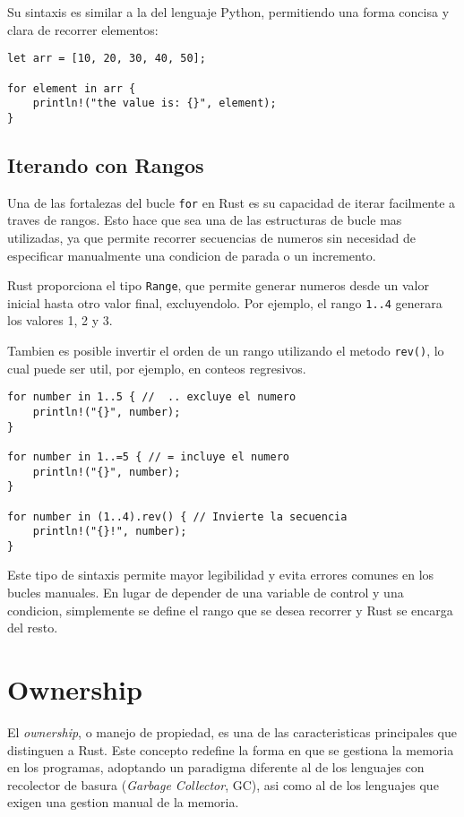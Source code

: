 \documentclass[12pt]{article}
\begin{document}
Su sintaxis es similar a la del lenguaje Python, permitiendo una forma concisa y clara de recorrer elementos:

\begin{lstlisting}[style=ruststyle]
let arr = [10, 20, 30, 40, 50];

for element in arr {
	println!("the value is: {}", element);
}
\end{lstlisting}

\subsection{Iterando con Rangos}

Una de las fortalezas del bucle \texttt{for} en Rust es su capacidad de iterar facilmente a traves de rangos. Esto hace que sea una de las estructuras de bucle mas utilizadas, ya que permite recorrer secuencias de numeros sin necesidad de especificar manualmente una condicion de parada o un incremento.

Rust proporciona el tipo \texttt{Range}, que permite generar numeros desde un valor inicial hasta otro valor final, excluyendolo. Por ejemplo, el rango \texttt{1..4} generara los valores 1, 2 y 3.

Tambien es posible invertir el orden de un rango utilizando el metodo \texttt{rev()}, lo cual puede ser util, por ejemplo, en conteos regresivos.

\begin{lstlisting}[style=ruststyle]
for number in 1..5 { //  .. excluye el numero
	println!("{}", number);
}

for number in 1..=5 { // = incluye el numero
	println!("{}", number);
}

for number in (1..4).rev() { // Invierte la secuencia
	println!("{}!", number);
}
\end{lstlisting}

Este tipo de sintaxis permite mayor legibilidad y evita errores comunes en los bucles manuales. En lugar de depender de una variable de control y una condicion, simplemente se define el rango que se desea recorrer y Rust se encarga del resto.

\section{Ownership}

El \textit{ownership}, o manejo de propiedad, es una de las caracteristicas principales que distinguen a Rust. Este concepto redefine la forma en que se gestiona la memoria en los programas, adoptando un paradigma diferente al de los lenguajes con recolector de basura (\textit{Garbage Collector}, GC), asi como al de los lenguajes que exigen una gestion manual de la memoria.
\end{document}
